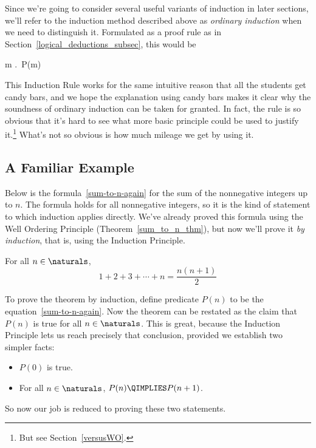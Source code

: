 Since we're going to consider several useful variants of induction in
later sections, we'll refer to the induction method described above as
\emph{ordinary induction} when we need to distinguish it.  Formulated
as a proof rule as in Section~\ref{logical_deductions_subsec}, this
would be
\begin{rul*} 
{\forall m \in \naturals.\, P(m)}
\end{rul*}

This Induction Rule works for the same intuitive reason that all
the students get candy bars, and we hope the explanation using candy bars
makes it clear why the soundness of ordinary induction can be taken
for granted.  In fact, the rule is so obvious that it's hard to see what
more basic principle could be used to justify it.\footnote{But see
Section~\ref{versusWO}.}  What's not so obvious is how much mileage 
we get by using it.

\subsection{A Familiar Example}

Below is the formula~\eqref{sum-to-n-again} for the sum of the
nonnegative integers up to $n$.  The formula holds for all nonnegative
integers, so it is the kind of statement to which induction applies
directly.  We've already proved this formula using the Well
  Ordering Principle (Theorem~\ref{sum_to_n_thm}), but now we'll
prove it \emph{by induction}, that is, using the Induction Principle.
\begin{theorem}\label{sum-to-n-again-theorem}
For all $n \in \naturals$,
\begin{equation}\label{sum-to-n-again}
1 + 2 + 3 + \cdots + n = \frac{n(n+1)}{2}
\end{equation}
\end{theorem}

To prove the theorem by induction, define predicate $P(n)$ to be the
equation~\eqref{sum-to-n-again}.  Now the theorem can be restated as
the claim that $P(n)$ is true for all $n \in \naturals$.  This is
great, because the Induction Principle lets us reach precisely that
conclusion, provided we establish two simpler facts:
\begin{itemize}
\item $P(0)$ is true.
\item For all $n \in \naturals$, $P(n) \QIMPLIES P(n+1)$.
\end{itemize}
So now our job is reduced to proving these two statements.

